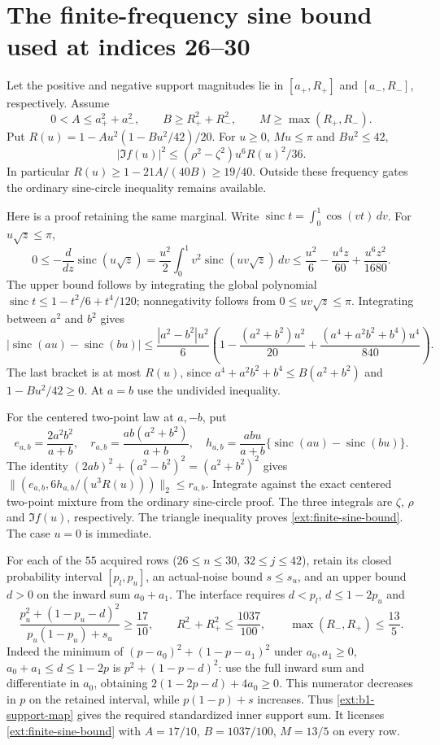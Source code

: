 \section{The finite-frequency sine bound used at indices 26--30}
\label{ext:finite-sine}
Let the positive and negative support magnitudes lie in
$[a_+,R_+]$ and $[a_-,R_-]$, respectively. Assume
\[
 0<A\le a_+^2+a_-^2,\qquad
 B\ge R_+^2+R_-^2,\qquad M\ge\max(R_+,R_-).
\]
Put $R(u)=1-Au^2(1-Bu^2/42)/20$.
For $u\ge0$, $Mu\le\pi$ and $Bu^2\le42$,
\begin{equation}\label{ext:finite-sine-bound}
 |\Im f(u)|^2\le(\rho^2-\zeta^2)u^6R(u)^2/36.
\end{equation}
In particular $R(u)\ge1-21A/(40B)\ge19/40$.
Outside these frequency gates the ordinary sine-circle inequality
remains available.

Here is a proof retaining the same marginal. Write
$\operatorname{sinc}t=\int_0^1\cos(vt)\,dv$. For $u\sqrt z\le\pi$,
\[
 0\le-\frac{d}{dz}\operatorname{sinc}(u\sqrt z)
 =\frac{u^2}{2}\int_0^1v^2\operatorname{sinc}(uv\sqrt z)\,dv
 \le\frac{u^2}6-\frac{u^4z}{60}+\frac{u^6z^2}{1680}.
\]
The upper bound follows by integrating the global polynomial
$\operatorname{sinc}t\le1-t^2/6+t^4/120$; nonnegativity follows
from $0\le uv\sqrt z\le\pi$.
Integrating between $a^2$ and $b^2$ gives
\[
 |\operatorname{sinc}(au)-\operatorname{sinc}(bu)|
 \le\frac{|a^2-b^2|u^2}{6}
 \left(1-\frac{(a^2+b^2)u^2}{20}
       +\frac{(a^4+a^2b^2+b^4)u^4}{840}\right).
\]
The last bracket is at most $R(u)$, since
$a^4+a^2b^2+b^4\le B(a^2+b^2)$ and
$1-Bu^2/42\ge0$. At $a=b$ use the undivided inequality.

For the centered two-point law at $a,-b$, put
\[
 e_{a,b}=\frac{2a^2b^2}{a+b},\quad
 r_{a,b}=\frac{ab(a^2+b^2)}{a+b},\quad
 h_{a,b}=\frac{abu}{a+b}
       \{\operatorname{sinc}(au)-\operatorname{sinc}(bu)\}.
\]
The identity $(2ab)^2+(a^2-b^2)^2=(a^2+b^2)^2$ gives
$\|(e_{a,b},6h_{a,b}/(u^3R(u)))\|_2\le r_{a,b}$.
Integrate against the exact centered two-point mixture from the
ordinary sine-circle proof. The three integrals are $\zeta$, $\rho$
and $\Im f(u)$, respectively. The triangle inequality proves
\eqref{ext:finite-sine-bound}. The case $u=0$ is immediate.

For each of the $55$ acquired rows ($26\le n\le30$,
$32\le j\le42$), retain its closed probability interval
$[p_l,p_u]$, an actual-noise bound $s\le s_u$, and an upper
bound $d>0$ on the inward sum $a_0+a_1$.
The interface requires $d<p_l$, $d\le1-2p_u$ and
\begin{equation}\label{ext:b1-support-map}
 \frac{p_u^2+(1-p_u-d)^2}{p_u(1-p_u)+s_u}\ge\frac{17}{10},
 \qquad R_-^2+R_+^2\le\frac{1037}{100},
 \qquad \max(R_-,R_+)\le\frac{13}{5}.
\end{equation}
Indeed the minimum of $(p-a_0)^2+(1-p-a_1)^2$ under
$a_0,a_1\ge0$, $a_0+a_1\le d\le1-2p$ is
$p^2+(1-p-d)^2$: use the full inward sum and differentiate in
$a_0$, obtaining $2(1-2p-d)+4a_0\ge0$.
This numerator decreases in $p$ on the retained interval, while
$p(1-p)+s$ increases. Thus \eqref{ext:b1-support-map} gives the
required standardized inner support sum. It licenses
\eqref{ext:finite-sine-bound} with
$A=17/10$, $B=1037/100$, $M=13/5$ on every row.

